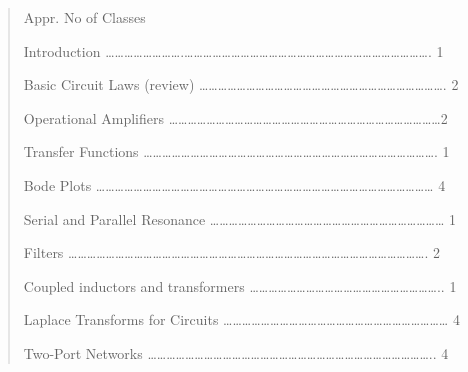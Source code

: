 \begin{quote}
Appr. No of Classes

Introduction
\ldots{}\ldots{}\ldots{}\ldots{}\ldots{}\ldots{}\ldots{}\ldots{}.\ldots{}\ldots{}\ldots{}\ldots{}\ldots{}\ldots{}\ldots{}\ldots{}\ldots{}\ldots{}\ldots{}\ldots{}\ldots{}\ldots{}\ldots{}\ldots{}\ldots{}\ldots{}\ldots{}\ldots{}\ldots{}\ldots{}\ldots{}\ldots{}\ldots{}\ldots{}.
1

Basic Circuit Laws (review)
\ldots{}\ldots{}\ldots{}\ldots{}\ldots{}\ldots{}\ldots{}\ldots{}\ldots{}\ldots{}\ldots{}\ldots{}\ldots{}\ldots{}\ldots{}\ldots{}\ldots{}\ldots{}\ldots{}\ldots{}\ldots{}\ldots{}\ldots{}\ldots{}\ldots{}\ldots{}.
2

Operational Amplifiers
\ldots{}\ldots{}\ldots{}\ldots{}\ldots{}\ldots{}\ldots{}\ldots{}\ldots{}\ldots{}\ldots{}\ldots{}\ldots{}\ldots{}\ldots{}\ldots{}\ldots{}\ldots{}\ldots{}\ldots{}\ldots{}\ldots{}\ldots{}\ldots{}\ldots{}\ldots{}\ldots{}\ldots{}\ldots{}2

Transfer Functions
\ldots{}\ldots{}\ldots{}\ldots{}\ldots{}\ldots{}\ldots{}\ldots{}\ldots{}\ldots{}\ldots{}\ldots{}\ldots{}\ldots{}\ldots{}\ldots{}\ldots{}\ldots{}\ldots{}\ldots{}\ldots{}\ldots{}\ldots{}\ldots{}\ldots{}\ldots{}\ldots{}\ldots{}\ldots{}\ldots{}\ldots{}.
1

Bode Plots
\ldots{}\ldots{}\ldots{}\ldots{}\ldots{}\ldots{}\ldots{}\ldots{}\ldots{}\ldots{}\ldots{}\ldots{}\ldots{}\ldots{}\ldots{}\ldots{}\ldots{}\ldots{}\ldots{}\ldots{}\ldots{}\ldots{}\ldots{}\ldots{}\ldots{}\ldots{}\ldots{}\ldots{}\ldots{}\ldots{}\ldots{}\ldots{}\ldots{}\ldots{}\ldots{}\ldots{}
4

Serial and Parallel Resonance
\ldots{}\ldots{}\ldots{}\ldots{}\ldots{}\ldots{}\ldots{}\ldots{}\ldots{}\ldots{}\ldots{}\ldots{}\ldots{}\ldots{}\ldots{}\ldots{}\ldots{}\ldots{}\ldots{}\ldots{}\ldots{}\ldots{}\ldots{}\ldots{}\ldots{}
1

Filters
\ldots{}\ldots{}\ldots{}\ldots{}\ldots{}\ldots{}\ldots{}\ldots{}\ldots{}\ldots{}\ldots{}\ldots{}\ldots{}\ldots{}\ldots{}\ldots{}\ldots{}\ldots{}\ldots{}\ldots{}\ldots{}\ldots{}\ldots{}\ldots{}\ldots{}\ldots{}\ldots{}\ldots{}\ldots{}\ldots{}\ldots{}\ldots{}\ldots{}\ldots{}\ldots{}\ldots{}\ldots{}\ldots{}.
2

Coupled inductors and transformers
\ldots{}\ldots{}\ldots{}\ldots{}\ldots{}\ldots{}\ldots{}\ldots{}\ldots{}\ldots{}\ldots{}\ldots{}\ldots{}\ldots{}\ldots{}\ldots{}\ldots{}\ldots{}\ldots{}\ldots{}..
1

Laplace Transforms for Circuits
\ldots{}\ldots{}\ldots{}\ldots{}\ldots{}\ldots{}\ldots{}\ldots{}\ldots{}\ldots{}\ldots{}\ldots{}\ldots{}\ldots{}\ldots{}\ldots{}\ldots{}\ldots{}\ldots{}\ldots{}\ldots{}\ldots{}\ldots{}\ldots{}
4

Two-Port Networks
\ldots{}\ldots{}\ldots{}\ldots{}\ldots{}\ldots{}\ldots{}\ldots{}\ldots{}\ldots{}\ldots{}\ldots{}\ldots{}\ldots{}\ldots{}\ldots{}\ldots{}\ldots{}\ldots{}\ldots{}\ldots{}\ldots{}\ldots{}\ldots{}\ldots{}\ldots{}\ldots{}\ldots{}\ldots{}\ldots{}..
4
\end{quote}

